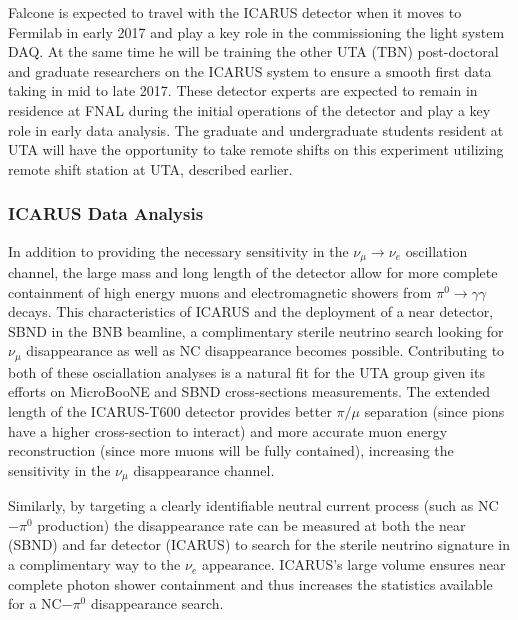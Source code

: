 Falcone is expected to travel with the ICARUS detector when it moves to Fermilab in early 2017 and play a key role in the commissioning the light system DAQ. At the same time he will be training the other UTA (TBN) post-doctoral and graduate researchers on the ICARUS system to ensure a smooth first data taking in mid to late 2017. These detector experts are expected to remain in residence at FNAL during the initial operations of the detector and play a key role in early data analysis. The graduate and undergraduate students resident at UTA will have the opportunity to take remote shifts on this experiment utilizing remote shift station at UTA, described earlier.

\subsubsection{ICARUS Data Analysis}\label{sec:ICARUSDataAnalysis}
In addition to providing the necessary sensitivity in the $\nu_{\mu} \rightarrow \nu_{e}$ oscillation channel, the large mass and long length of the detector allow for more complete containment of high energy muons and electromagnetic showers from $\pi^{0} \rightarrow \gamma \gamma$ decays.  This characteristics of ICARUS and the deployment of a near detector, SBND in the BNB beamline, a complimentary sterile neutrino search looking for $\nu_{\mu}$  disappearance as well as  NC disappearance becomes possible. Contributing to both of these osciallation analyses is a natural fit for the UTA group given its efforts on MicroBooNE and SBND cross-sections measurements. The extended length of the ICARUS-T600 detector provides better $\pi / \mu$ separation (since pions have a higher cross-section to interact) and more accurate muon energy reconstruction (since more muons will be fully contained), increasing the sensitivity in the $\nu_{\mu}$ disappearance channel. 

Similarly, by targeting a clearly identifiable neutral current process (such as NC$-\pi^{0}$ production) the disappearance rate can be measured at both the near (SBND) and far detector (ICARUS) to search for the sterile neutrino signature in a complimentary way to the $\nu_{e}$ appearance. ICARUS's large volume ensures near complete photon shower containment and thus increases the statistics available for a NC$-\pi^{0}$ disappearance search.

